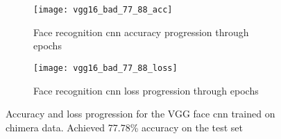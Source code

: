\begin{figure}[H]
	\centering
	\begin{subfigure}{0.48\textwidth}
		\centering
		\texttt{[image: vgg16\_bad\_77\_88\_acc]}
		\caption{Face recognition \gls{cnn} accuracy progression through epochs}
		\label{fig:vgg_77_acc}
	\end{subfigure}
	\begin{subfigure}{0.48\textwidth}
		\centering
		\texttt{[image: vgg16\_bad\_77\_88\_loss]}
		\caption{Face recognition \gls{cnn} loss progression through epochs}
		\label{fig:vgg_77_loss}
	\end{subfigure}
	\caption{Accuracy and loss progression for the VGG face \gls{cnn} trained on chimera data. Achieved 77.78\% accuracy on the test set }
	\label{fig:vgg_77_graphs}
\end{figure}

